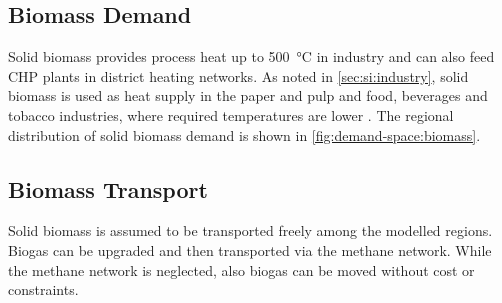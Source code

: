 \subsection{Biomass Demand}
\label{sec:si:bio:demand}

Solid biomass provides process heat up to \SI{500}{\celsius} in industry and can
also feed CHP plants in district heating networks. As noted in
\cref{sec:si:industry}, solid biomass is used as heat supply in the paper and
pulp and food, beverages and tobacco industries, where required temperatures are
lower .
The regional distribution of solid biomass demand is shown in
\cref{fig:demand-space:biomass}.

\subsection{Biomass Transport}
\label{sec:si:bio:transport}

Solid biomass is assumed to be transported freely among the modelled regions.
Biogas can be upgraded and then transported via the methane network. While the
methane network is neglected, also biogas can be moved without cost or
constraints.